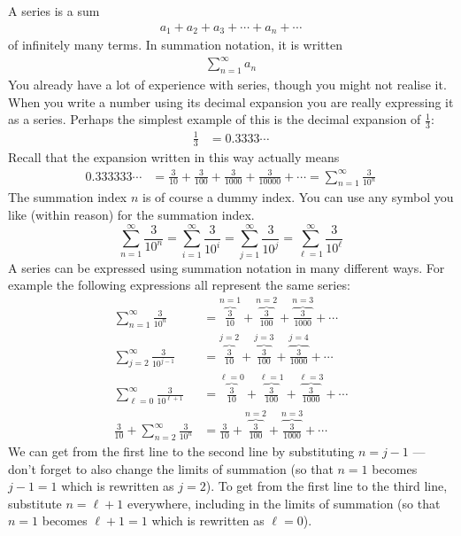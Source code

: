 A series is a sum
\begin{align*}
a_1+a_2+a_3+\cdots+a_n+\cdots
\end{align*}
of infinitely many terms. In summation notation, it is written
\begin{align*}
\sum_{n=1}^\infty a_n
\end{align*}
You already have a lot of experience with series, though you might
not realise it. When you write a number using its decimal expansion
you are really expressing it as a series. Perhaps the simplest example
of this is the decimal expansion of $\frac{1}{3}$:
\begin{align*}
 \frac{1}{3} &= 0.3333\cdots
\end{align*}
Recall that the expansion written in this way actually means
\begin{align*}
0.333333\cdots &= \frac{3}{10}+\frac{3}{100}+\frac{3}{1000}+\frac{3}{10000}+\cdots
=\sum_{n=1}^\infty\frac{3}{10^n}
\end{align*}
The summation index $n$ is of course a dummy index. You can use any symbol
you like (within reason) for the summation index.
\begin{equation*}
\sum_{n=1}^\infty\frac{3}{10^n}
=\sum_{i=1}^\infty\frac{3}{10^i}
=\sum_{j=1}^\infty\frac{3}{10^j}
=\sum_{\ell=1}^\infty\frac{3}{10^\ell}
\end{equation*}
A series can be expressed using summation notation in many different
ways. For example the following expressions all represent the same series:
\begin{align*}
\sum_{n=1}^\infty\frac{3}{10^n}
 &= \overbrace{\frac{3}{10}}^{n=1}
    +\overbrace{\frac{3}{100}}^{n=2}
    +\overbrace{\frac{3}{1000}}^{n=3}+\cdots \\
\sum_{j=2}^\infty\frac{3}{10^{j-1}}
 &= \overbrace{\frac{3}{10}}^{j=2}
    +\overbrace{\frac{3}{100}}^{j=3}
    +\overbrace{\frac{3}{1000}}^{j=4}+\cdots
\\
\sum_{\ell=0}^\infty\frac{3}{10^{\ell+1}}
 &= \overbrace{\frac{3}{10}}^{\ell=0}
    +\overbrace{\frac{3}{100}}^{\ell=1}
    +\overbrace{\frac{3}{1000}}^{\ell=3}+\cdots
\\
\frac{3}{10}+\sum_{n=2}^\infty\frac{3}{10^n}
 &= \frac{3}{10}
    +\overbrace{\frac{3}{100}}^{n=2}
    +\overbrace{\frac{3}{1000}}^{n=3}+\cdots
\end{align*}
We can get from  the first line to the second line by substituting $n=j-1$ ---
don't forget to also change the limits of summation (so that $n=1$ becomes
$j-1=1$ which is rewritten as $j=2$).
To get from the first line to the
third line, substitute $n=\ell+1$ everywhere, including in the limits of summation (so that $n=1$ becomes $\ell+1=1$
which is rewritten as $\ell=0$).

